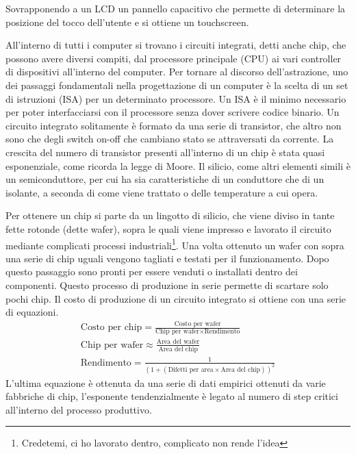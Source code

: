 \documentclass[a4paper,12pt]{article}
\theoremstyle{break}
\numberwithin{equation}{section}
\begin{document}
Sovrapponendo a un LCD un pannello capacitivo che permette di determinare la posizione del tocco dell'utente e si ottiene un touchscreen.


All'interno di tutti i computer si trovano i circuiti integrati, detti anche chip, che possono avere diversi compiti, dal processore principale (CPU) ai vari controller di dispositivi all'interno del computer. 
Per tornare al discorso dell'astrazione, uno dei passaggi fondamentali nella progettazione di un computer è la scelta di un set di istruzioni (ISA) per un determinato processore. Un ISA è il minimo necessario per poter interfacciarsi con il processore senza dover scrivere codice binario.
Un circuito integrato solitamente è formato da una serie di transistor, che altro non sono che degli switch on-off che cambiano stato se attraversati da corrente. La crescita del numero di transistor presenti all'interno di un chip è stata quasi esponenziale, come ricorda la legge di Moore. Il silicio, come altri elementi simili è un semiconduttore, per cui ha sia caratteristiche di un conduttore che di un isolante, a seconda di come viene trattato o delle temperature a cui opera. 


Per ottenere un chip si parte da un lingotto di silicio, che viene diviso in tante fette rotonde (dette wafer), sopra le quali viene impresso e lavorato il circuito mediante complicati processi industriali\footnote{Credetemi, ci ho lavorato dentro, complicato non rende l'idea}. Una volta ottenuto un wafer con sopra una serie di chip uguali vengono tagliati e testati per il funzionamento. Dopo questo passaggio sono pronti per essere venduti o installati dentro dei componenti.
Questo processo di produzione in serie permette di scartare solo pochi chip.
Il costo di produzione di un circuito integrato si ottiene con una serie di equazioni.
\begin{gather*}
    \mbox{Costo per chip}=\frac{\mbox{Costo per wafer}}{\mbox{Chip per wafer} \times \mbox{Rendimento}} \\
    \mbox{Chip per wafer} \approx \frac{\mbox{Area del wafer}}{\mbox{Area del chip}} \\
    \mbox{Rendimento} = \frac{1}{(1 + (\mbox{Difetti per area} \times \mbox{Area del chip}))^2}
\end{gather*}
L'ultima equazione è ottenuta da una serie di dati empirici ottenuti da varie fabbriche di chip, l'esponente tendenzialmente è legato al numero di step critici all'interno del processo produttivo.
\end{document}
